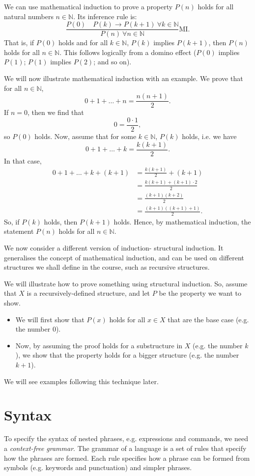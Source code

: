 \documentclass[a4paper, openany]{memoir}
\begin{document}
    We can use mathematical induction to prove a property $P(n)$ holds for all natural numbers $n \in \mathbb{N}$. Its inference rule is:
    \[\frac{P(0) \quad P(k) \to P(k+1) \ \forall k \in \mathbb{N}}{P(n) \ \forall n \in \mathbb{N}} \textrm{MI}.\]
    That is, if $P(0)$ holds and for all $k \in \mathbb{N}$, $P(k)$ implies $P(k+1)$, then $P(n)$ holds for all $n \in \mathbb{N}$. This follows logically from a domino effect ($P(0)$ implies $P(1)$; $P(1)$ implies $P(2)$; and so on).

    We will now illustrate mathematical induction with an example. We prove that for all $n \in \mathbb{N}$,
    \[0 + 1 + \dots + n = \frac{n(n+1)}{2}.\]
    If $n = 0$, then we find that
    \[0 = \frac{0 \cdot 1}{2},\]
    so $P(0)$ holds. Now, assume that for some $k \in \mathbb{N}$, $P(k)$ holds, i.e. we have
    \[0 + 1 + \dots + k = \frac{k(k+1)}{2}.\]
    In that case,
    \begin{align*}
        0 + 1 + \dots + k + (k+1) &= \frac{k(k+1)}{2} + (k+1) \\
        &= \frac{k(k+1) + (k+1) \cdot 2}{2} \\
        &= \frac{(k+1)(k+2)}{2} \\
        &= \frac{(k+1)((k+1) + 1)}{2}.
    \end{align*}
    So, if $P(k)$ holds, then $P(k+1)$ holds. Hence, by mathematical induction, the statement $P(n)$ holds for all $n \in \mathbb{N}$.

    We now consider a different version of induction- structural induction. It generalises the concept of mathematical induction, and can be used on different structures we shall define in the course, such as recursive structures.
    
    We will illustrate how to prove something using structural induction. So, assume that $X$ is a recursively-defined structure, and let $P$ be the property we want to show.
    \begin{itemize}
        \item We will first show that $P(x)$ holds for all $x \in X$ that are the base case (e.g. the number $0$).
        \item Now, by assuming the proof holds for a substructure in $X$ (e.g. the number $k$), we show that the property holds for a bigger structure (e.g. the number $k+1$).
    \end{itemize}
    We will see examples following this technique later.

    \newpage

    \section{Syntax}
    To specify the syntax of nested phrases, e.g. expressions and commands, we need a \emph{context-free grammar}. The grammar of a language is a set of rules that specify how the phrases are formed. Each rule specifies how a phrase can be formed from symbols (e.g. keywords and punctuation) and simpler phrases.
\end{document}
